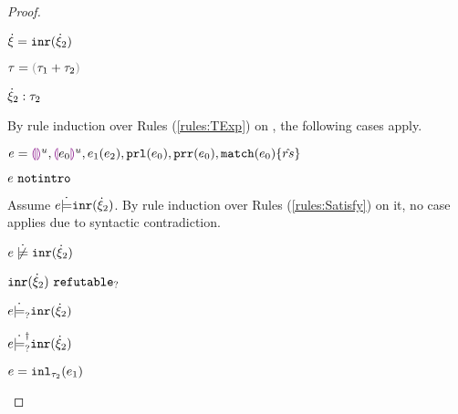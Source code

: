 \begin{proof}
\begin{byCases}
\begin{byCases}
    \end{byCases}
\item[\text{(\ref{rule:CTInr})}]
    \begin{pfsteps*}
    \item $\dot{\xi}=\mathtt{inr}(\dot{\xi}_2)$ 
    \item $\tau=\tsum{\tau_1}{\tau_2}$ 
    \item $\dot{\xi}_2 : \tau_2$  
    \end{pfsteps*}
    By rule induction over Rules (\ref{rules:TExp}) on , the following cases apply.
    \begin{byCases}
    \item[\text{(\ref{rule:TEHole}),(\ref{rule:THole}),(\ref{rule:TAp}),(\ref{rule:TPrl}),(\ref{rule:TPrr}),(\ref{rule:TMatchZPre}),(\ref{rule:TMatchNZPre})}]
        \begin{pfsteps*}
        \item $e=\textcolor{violet}{\llparenthesis}\textcolor{violet}{\rrparenthesis}^{u},\textcolor{violet}{\llparenthesis} e_0\textcolor{violet}{\rrparenthesis}^{u},e_1(e_2),\mathtt{prl}(e_0),\mathtt{prr}(e_0),\mathtt{match}(e_0) \{\hat{rs}\}$ 
        \item $e ~\mathtt{notintro}$  
        \end{pfsteps*}
        Assume $e \dot{\models} \mathtt{inr}(\dot{\xi}_2)$. By rule induction over Rules (\ref{rules:Satisfy}) on it, no case applies due to syntactic contradiction.
        \begin{pfsteps*}
        \item $\cnotsatisfy{e}{\cinr{\hxi_2}}$  
        \item $\mathtt{inr}(\dot{\xi}_2) ~\mathtt{refutable}_?$  
        \item $e \dot{\models}_{?} \mathtt{inr}(\dot{\xi}_2)$  
        \item $e \dot{\models}_{?}^{\dag} \mathtt{inr}(\dot{\xi}_2)$ 
        \end{pfsteps*}
    \item[\text{(\ref{rule:TInl})}]
        \begin{pfsteps*}
        \item $e=\mathtt{inl}_{\tau_2}({e_1})$ 
        \end{pfsteps*}

\end{byCases}
\end{byCases}
\end{proof}
